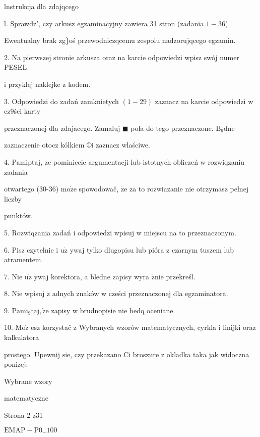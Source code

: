 \documentclass[a4paper,12pt]{article}
\begin{document}
lnstrukcja dla zdajqcego

l. Sprawdz', czy arkusz egzaminacyjny zawiera 31 stron (zadania $1-36$).

Ewentualny brak zg\}oś przewodniczqcemu zespolu nadzorujqcego egzamin.

2. Na pierwszej stronie arkusza oraz na karcie odpowiedzi wpisz swój numer PESEL

i przyklej naklejke z kodem.

3. Odpowiedzi do zadań zamknietych $(1-29)$ zaznacz na karcie odpowiedzi w cz9ści karty

przeznaczonej dla zdajacego. Zamaluj $\blacksquare$ pola do tego przeznaczone. $\mathrm{B}_{9}\mathrm{d}\mathrm{n}\mathrm{e}$

zaznaczenie otocz kólkiem \copyright i zaznacz wlaściwe.

4. Pamiptaj, $\dot{\mathrm{z}}\mathrm{e}$ pominiecie argumentacji lub istotnych obliczeń w rozwiqzaniu zadania

otwartego (30-36) $\mathrm{m}\mathrm{o}\dot{\mathrm{z}}\mathrm{e}$ spowodowač, $\dot{\mathrm{z}}\mathrm{e}$ za to rozwiazanie nie otrzymasz pelnej liczby

punktów.

5. Rozwiqzania zadań i odpowiedzi wpisuj w miejscu na to przeznaczonym.

6. Pisz czytelnie i $\mathrm{u}\dot{\mathrm{z}}$ ywaj tylko dlugopisu lub pióra z czarnym tuszem lub atramentem.

7. Nie $\mathrm{u}\dot{\mathrm{z}}$ ywaj korektora, a bledne zapisy wyra $\acute{\mathrm{z}}\mathrm{n}\mathrm{i}\mathrm{e}$ przekreśl.

8. Nie wpisuj $\dot{\mathrm{z}}$ adnych znaków w cześci przeznaczonej dla egzaminatora.

9. $\mathrm{P}\mathrm{a}\mathrm{m}\mathrm{i}_{9}\mathrm{t}\mathrm{a}\mathrm{j}, \dot{\mathrm{z}}\mathrm{e}$ zapisy w brudnopisie nie bedq oceniane.

10. $\mathrm{M}\mathrm{o}\dot{\mathrm{z}}$ esz korzystač z Wybranych wzorów matematycznych, cyrkla i linijki oraz kalkulatora

prostego. Upewnij $\mathrm{s}\mathrm{i}\mathrm{e}$, czy przekazano Ci broszure z okladka taka jak widoczna ponizej.

Wybrane wzory

matematyczne

Strona 2 z31

$\mathrm{E}\mathrm{M}\mathrm{A}\mathrm{P}-\mathrm{P}0_{-}100$
\end{document}
